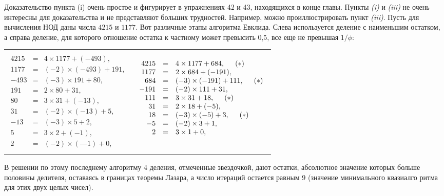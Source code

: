 \documentclass{mai_book}
\begin{document}
\begin{myproof}
Доказательство пункта (i) очень простое и фигурирует в упражне­ниях 42 и 43, находящихся в конце главы. Пункты \textit{(i)} и \textit{(iii)} не очень
интересны для доказательства и не представляют больших трудно­стей. Например, можно проиллюстрировать пункт \textit{(iii)}. Пусть для
вычисления НОД даны числа $4215$ и $1177$. Вот различные этапы ал­горитма Евклида. Слева используется деление с наименьшим остат­ком, а справа деление, для которого отношение остатка к частному
может превысить 0,5, все еще не превышая $1/\phi$:

\begin{tabular}{c|c}

$\begin{array}{rcl}
\;\\
4215 & = & 4 \times 1177 + (-493),\\
1177 & = & (-2 )\times(-493)+191,\\
-493 & = & (-3)\times 191+80,\\
191  & = & 2\times 80+31,\\
80   & = & 3\times 31+(-13),\\
31   & = & (-2)\times(-13)+5,\\
-13  & = &(-3)\times 5+2,\\
5    & = & 3\times 2+(-1),\\
2    & = & (-2)\times(—1)+0,\\
\;
\end{array}$ &
$\begin{array}{rcl}
\;\\
4215 &=& 4 \times 1177 + 684,\hspace*{0.5cm}(*)\\
1177 &=& 2\times 684 + (-191),\\
684 & = & (-3)\times (-191)+111,\hspace*{0.5cm}(*)\\
-191  & = & (-2)\times 111+31,\\
111 & = & 3\times 31+18,\hspace*{0.5cm}(*)\\
31   & = & 2\times 18+(-5),\\
18  & = &(-3)\times(-5)+3,\hspace*{0.5cm}(*)\\
-5    & = & (-2)\times 3+1,\\
2    & = & 3\times1+0,\\
\;
\end{array}$
\end{tabular}
В решении по этому последнему алгоритму 4 деления, отмеченные
звездочкой, дают остатки, абсолютное значение которых больше
половины делителя, оставаясь в границах теоремы Лазара, а число
итераций остается равным 9 (значение минимального квазиалго­
ритма для этих двух целых чисел).
\end{myproof}
\end{document}
